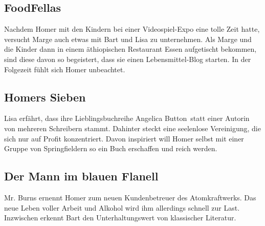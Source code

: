 \subsection{FoodFellas}
Nachdem Homer mit den Kindern bei einer Videospiel-Expo eine tolle Zeit hatte, versucht Marge auch etwas mit Bart und Lisa zu unternehmen. Als Marge und die Kinder dann in einem äthiopischen Restaurant Essen aufgetischt bekommen, sind diese davon so begeistert, dass sie einen Lebensmittel-Blog starten. In der Folgezeit fühlt sich Homer unbeachtet.


\subsection{Homers Sieben}\label{NABF22}
Lisa erfährt, dass ihre Lieblingsbuchreihe \glqq Angelica Button\grqq\ statt einer Autorin von mehreren Schreibern stammt. Dahinter steckt eine seelenlose Vereinigung, die sich nur auf Profit konzentriert. Davon inspiriert will Homer selbst mit einer Gruppe von Springfieldern so ein Buch erschaffen und reich werden.


\subsection{Der Mann im blauen Flanell}
Mr. Burns ernennt Homer zum neuen Kundenbetreuer des Atomkraftwerks. Das neue Leben voller Arbeit und Alkohol wird ihm allerdings schnell zur Last. Inzwischen erkennt Bart den Unterhaltungswert von klassischer Literatur.

